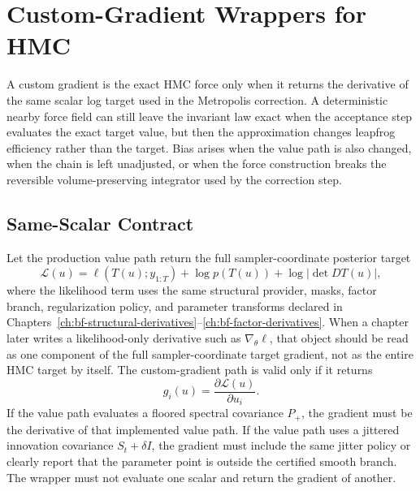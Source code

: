\chapter{Custom-Gradient Wrappers for HMC}
\label{ch:bf-custom-gradient-wrappers}

A custom gradient is the exact HMC force only when it returns the derivative of the same scalar log target used in the Metropolis correction. A deterministic nearby force field can still leave the invariant law exact when the acceptance step evaluates the exact target value, but then the approximation changes leapfrog efficiency rather than the target. Bias arises when the value path is also changed, when the chain is left unadjusted, or when the force construction breaks the reversible volume-preserving integrator used by the correction step.

\section{Same-Scalar Contract}
\label{sec:bf-custom-gradient-same-scalar}

Let the production value path return the full sampler-coordinate posterior target
\begin{equation}
\label{eq:bf-custom-primal-target}
  \mathcal{L}(u)
  =
  \ell(T(u);y_{1:T})
  + \log p(T(u))
  + \log\left|\det DT(u)\right|,
\end{equation}
where the likelihood term uses the same structural provider, masks, factor
branch, regularization policy, and parameter transforms declared in
Chapters~\ref{ch:bf-structural-derivatives}--\ref{ch:bf-factor-derivatives}.
When a chapter later writes a likelihood-only derivative such as
\(\nabla_\theta \ell\), that object should be read as one component of the full
sampler-coordinate target gradient, not as the entire HMC target by itself.  The
custom-gradient path is valid only if it returns
\begin{equation}
\label{eq:bf-custom-gradient-target}
  g_i(u)=\frac{\partial \mathcal{L}(u)}{\partial u_i}.
\end{equation}
If the value path evaluates a floored spectral covariance $P_+$, the gradient
must be the derivative of that implemented value path.  If the value path uses a
jittered innovation covariance $S_t+\delta I$, the gradient must include the
same jitter policy or clearly report that the parameter point is outside the
certified smooth branch.  The wrapper must not evaluate one scalar and return the
gradient of another.

